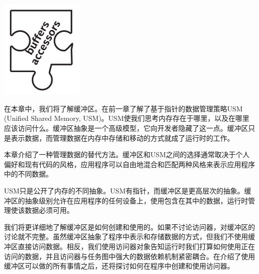 \begin{center}
	\includegraphics[width=0.3\textwidth]{content/chapter-7/images/1}
\end{center}

在本章中，我们将了解缓冲区。在前一章了解了基于指针的数据管理策略USM (Unified Shared Memory, USM)。USM使我们思考内存存在于哪里，以及在哪里应该访问什么。缓冲区抽象是一个高级模型，它向开发者隐藏了这一点。缓冲区只是表示数据，而管理数据在内存中存储和移动的方式就成了运行时的工作。\par

本章介绍了一种管理数据的替代方法。缓冲区和USM之间的选择通常取决于个人偏好和现有代码的风格，应用程序可以自由地混合和匹配两种风格来表示应用程序中的不同数据。\par

USM只是公开了内存的不同抽象。USM有指针，而缓冲区是更高层次的抽象。缓冲区的抽象级别允许在应用程序的任何设备上，使用包含在其中的数据，运行时管理使该数据必须可用。\par

我们将更详细地了解缓冲区是如何创建和使用的。如果不讨论访问器，对缓冲区的讨论就不完整。虽然缓冲区抽象了程序中表示和存储数据的方式，但我们不使用缓冲区直接访问数据。相反，我们使用访问器对象告知运行时我们打算如何使用正在访问的数据，并且访问器与任务图中强大的数据依赖机制紧密耦合。在介绍了使用缓冲区可以做的所有事情之后，还将探讨如何在程序中创建和使用访问器。\par

























